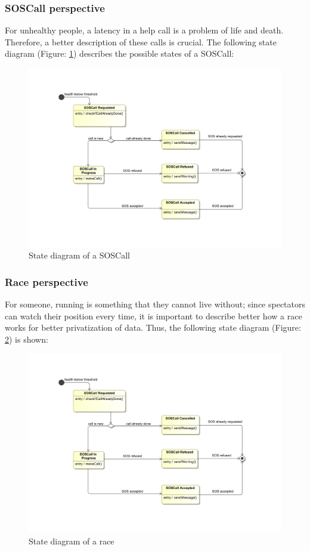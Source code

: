\subsubsection{SOSCall perspective}
For unhealthy people, a latency in a help call is a problem of life and death. Therefore, a better 
description of these calls is crucial. The following state diagram (Figure: \ref{fig:sosdiagram}) 
describes the possible states of a SOSCall:

\begin{figure}[H]
\includegraphics[width=0.8\linewidth]{Images/sosdiagram}
\caption{State diagram of a SOSCall}
\label{fig:sosdiagram}
\end{figure}

\subsubsection{Race perspective}
For someone, running is something that they cannot live without; since spectators can watch their 
position every time, it is important to describe better how a race works for better privatization of 
data. Thus, the following state diagram (Figure: \ref{fig:racediagram}) is shown: 

\begin{figure}[H]
\includegraphics[width=0.8\linewidth]{Images/sosdiagram}
\caption{State diagram of a race}
\label{fig:racediagram}
\end{figure}